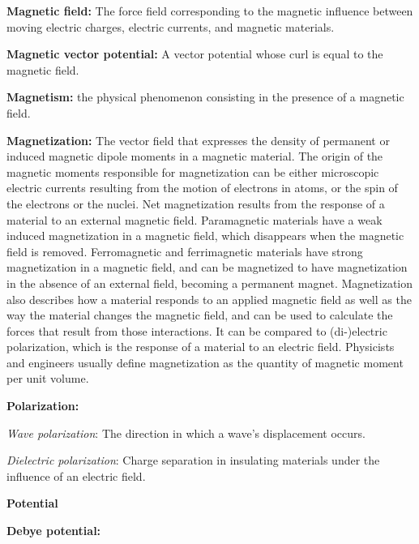 \documentclass[english]{book}
\begin{document}
\begin{list}{}{}
	\item \textbf{Magnetic field:} The force field corresponding to the magnetic influence between moving electric charges, electric currents, and magnetic materials.
	
	\item \textbf{Magnetic vector potential:} A vector potential whose curl is equal to the magnetic field.
	
	\item \textbf{Magnetism:} the physical phenomenon consisting in the presence of a magnetic field.
	
	\item \textbf{Magnetization:} The vector field that expresses the density of permanent or induced magnetic dipole moments in a magnetic material. The origin of the magnetic moments responsible for magnetization can be either microscopic electric currents resulting from the motion of electrons in atoms, or the spin of the electrons or the nuclei. Net magnetization results from the response of a material to an external magnetic field. Paramagnetic materials have a weak induced magnetization in a magnetic field, which disappears when the magnetic field is removed. Ferromagnetic and ferrimagnetic materials have strong magnetization in a magnetic field, and can be magnetized to have magnetization in the absence of an external field, becoming a permanent magnet. Magnetization also describes how a material responds to an applied magnetic field as well as the way the material changes the magnetic field, and can be used to calculate the forces that result from those interactions. It can be compared to (di-)electric polarization, which is the response of a material to an electric field. Physicists and engineers usually define magnetization as the quantity of magnetic moment per unit volume.
	
	\item \textbf{Polarization:}
		\begin{list}{}{}
			\item \emph{Wave polarization}: The direction in which a wave's displacement occurs.
			
			\item \emph{Dielectric polarization}: Charge separation in insulating materials under the influence of an electric field.
		\end{list}
	
	\item \textbf{Potential}
	\begin{list}{}{}
		\item \textbf{Debye potential:} 
		

\end{list}
\end{list}
\end{document}
